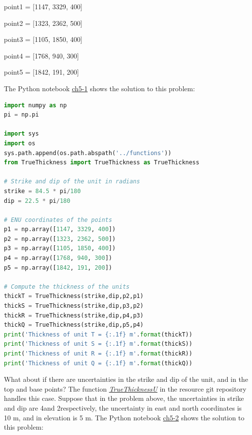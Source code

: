 \documentclass[a4paper , 12pt]{book}
\begin{document}
point1 = [1147, 3329, 400]

point2 = [1323, 2362, 500]

point3 = [1105, 1850, 400]

point4 = [1768, 940, 300]

point5 = [1842, 191, 200]

The Python notebook \href{https://github.com/nfcd/compGeo/blob/master/source/notebooks/ch5-1.ipynb}{ch5-1} shows the solution to this problem:

\begin{center}
\begin{lstlisting}[language=Python, frame=single]
import numpy as np
pi = np.pi

import sys
import os
sys.path.append(os.path.abspath('../functions'))
from TrueThickness import TrueThickness as TrueThickness

# Strike and dip of the unit in radians
strike = 84.5 * pi/180
dip = 22.5 * pi/180

# ENU coordinates of the points
p1 = np.array([1147, 3329, 400]) 
p2 = np.array([1323, 2362, 500]) 
p3 = np.array([1105, 1850, 400]) 
p4 = np.array([1768, 940, 300]) 
p5 = np.array([1842, 191, 200])

# Compute the thickness of the units
thickT = TrueThickness(strike,dip,p2,p1)
thickS = TrueThickness(strike,dip,p3,p2)
thickR = TrueThickness(strike,dip,p4,p3)
thickQ = TrueThickness(strike,dip,p5,p4)
print('Thickness of unit T = {:.1f} m'.format(thickT))
print('Thickness of unit S = {:.1f} m'.format(thickS))
print('Thickness of unit R = {:.1f} m'.format(thickR))
print('Thickness of unit Q = {:.1f} m'.format(thickQ))
\end{lstlisting}
\end{center}

What about if there are uncertainties in the strike and dip of the unit, and in the top and base points? The function \href{https://github.com/nfcd/compGeo/blob/master/source/functions/TrueThicknessU.py}{\textit{TrueThicknessU}} in the resource git repository handles this case. Suppose that in the problem above, the uncertainties in strike and dip are 4\degree and 2\degree respectively, the uncertainty in east and north coordinates is 10 m, and in elevation is 5 m. The Python notebook \href{https://github.com/nfcd/compGeo/blob/master/source/notebooks/ch5-2.ipynb}{ch5-2} shows the solution to this problem:
\end{document}
